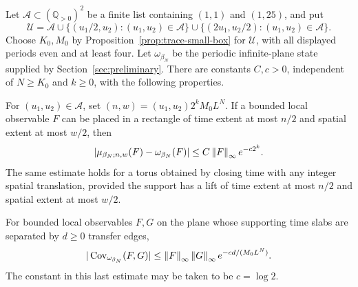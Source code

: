 \begin{theorem}
\label{thm:trace-uniform}
Let $\mathcal A\subset(\mathbb Q_{>0})^2$ be a finite list containing
$(1,1)$ and $(1,25)$, and put
\[
 \mathcal U=\mathcal A
    \cup\{(u_1/2,u_2):(u_1,u_2)\in\mathcal A\}
    \cup\{(2u_1,u_2/2):(u_1,u_2)\in\mathcal A\}.
\]
Choose $K_0,M_0$ by Proposition~\ref{prop:trace-small-box} for
$\mathcal U$, with all displayed periods even and at least four.  Let
$\omega_{\beta_N}$ be the periodic infinite-plane state supplied by
Section~\ref{sec:preliminary}.  There are constants $C,c>0$, independent
of $N\ge K_0$ and $k\ge0$, with the following properties.

For $(u_1,u_2)\in\mathcal A$, set
$(n,w)=(u_1,u_2)2^kM_0L^N$.  If a bounded local observable $F$ can be
placed in a rectangle of time extent at most $n/2$ and spatial extent
at most $w/2$, then
\begin{equation}
 |\mu_{\beta_N;n,w}(F)-\omega_{\beta_N}(F)|
       \le C\left\lVert F\right\rVert_\infty e^{-c2^k}.
 \label{eq:trace-uniform-volume}
\end{equation}
The same estimate holds for a torus obtained by closing time with any
integer spatial translation, provided the support has a lift of time
extent at most $n/2$ and spatial extent at most $w/2$.

For bounded local observables $F,G$ on the plane whose supporting time
slabs are separated by $d\ge0$ transfer edges,
\begin{equation}
 |\operatorname{Cov}_{\omega_{\beta_N}}(F,G)|
    \le\left\lVert F\right\rVert_\infty\left\lVert G\right\rVert_\infty
       e^{-c d/(M_0L^N)}.
 \label{eq:orig-26}
\end{equation}
The constant in this last estimate may be taken to be $c=\log2$.
\end{theorem}

